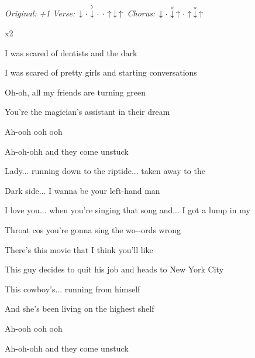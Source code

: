 \begin{song}


\begin{headerbox}
\RaiseBoxWithAccents
\textit{Original: +1} \quad
\textit{Verse:} $\Down\Miss\AccentDown\Miss\Miss\Up\Down\Up$ \quad
\textit{Chorus:} $\Down\Miss\ChuckDown\Up\Miss\Up\ChuckDown\Up$
\end{headerbox}

\begin{hchordbox}
\end{hchordbox}

\bigskip

    x2

\bigskip

I was scared of dentists and the dark \par
{}I was scared of pretty girls and starting conversations \par
Oh-oh, all my friends are turning green \par
You're the magician's assistant in their dream \par
Ah-ooh ooh ooh \par
Ah-oh-ohh  and they come unstuck \par

\bigskip

\begin{chorusbox}{\Chorus}
Lady... running down to the riptide... taken away to the \par
{}Dark side... I wanna be your left-hand man \par
I love you... when you're singing that song and... I got a lump in my \par
{}Throat cos you're gonna sing the wo--ords wrong \par
\end{chorusbox}

\bigskip

There's this movie that I think you'll like \par
This  guy decides to quit his job and heads to New York City \par
This cowboy's... running from himself \par
And she's been living on the highest shelf \par
Ah-ooh ooh ooh \par
Ah-oh-ohh  and they come unstuck \par


\end{song}
